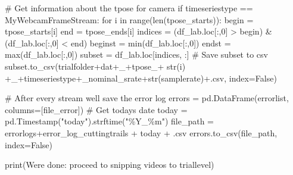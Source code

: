\documentclass[
  letterpaper,
  DIV=11,
  numbers=noendperiod]{scrreprt}
\newenvironment{Shaded}{\begin{snugshade}}{\end{snugshade}}
\newcommand{\BuiltInTok}[1]{\textcolor[rgb]{0.00,0.23,0.31}{#1}}
\newcommand{\CommentTok}[1]{\textcolor[rgb]{0.37,0.37,0.37}{#1}}
\newcommand{\ControlFlowTok}[1]{\textcolor[rgb]{0.00,0.23,0.31}{#1}}
\newcommand{\DecValTok}[1]{\textcolor[rgb]{0.68,0.00,0.00}{#1}}
\newcommand{\KeywordTok}[1]{\textcolor[rgb]{0.00,0.23,0.31}{#1}}
\newcommand{\NormalTok}[1]{\textcolor[rgb]{0.00,0.23,0.31}{#1}}
\newcommand{\OperatorTok}[1]{\textcolor[rgb]{0.37,0.37,0.37}{#1}}
\newcommand{\StringTok}[1]{\textcolor[rgb]{0.13,0.47,0.30}{#1}}
\newcommand{\VariableTok}[1]{\textcolor[rgb]{0.07,0.07,0.07}{#1}}
\begin{document}
\begin{Shaded}
\begin{Highlighting}[]
            \CommentTok{\# Get information about the tpose for camera}
            \ControlFlowTok{if}\NormalTok{ timeseriestype }\OperatorTok{==} \StringTok{\textquotesingle{}MyWebcamFrameStream\textquotesingle{}}\NormalTok{:}
                \ControlFlowTok{for}\NormalTok{ i }\KeywordTok{in} \BuiltInTok{range}\NormalTok{(}\BuiltInTok{len}\NormalTok{(tpose\_starts)):}
\NormalTok{                    begin }\OperatorTok{=}\NormalTok{ tpose\_starts[i]}
\NormalTok{                    end }\OperatorTok{=}\NormalTok{ tpose\_ends[i]}
\NormalTok{                    indices }\OperatorTok{=}\NormalTok{ (df\_lab.loc[:,}\DecValTok{0}\NormalTok{] }\OperatorTok{\textgreater{}}\NormalTok{ begin) }\OperatorTok{\&}\NormalTok{ (df\_lab.loc[:,}\DecValTok{0}\NormalTok{] }\OperatorTok{\textless{}}\NormalTok{ end)}
\NormalTok{                    beginst }\OperatorTok{=} \BuiltInTok{min}\NormalTok{(df\_lab.loc[:,}\DecValTok{0}\NormalTok{])}
\NormalTok{                    endst }\OperatorTok{=} \BuiltInTok{max}\NormalTok{(df\_lab.loc[:,}\DecValTok{0}\NormalTok{])}
\NormalTok{                    subset }\OperatorTok{=}\NormalTok{ df\_lab.loc[indices, :]}
                    \CommentTok{\# Save subset to csv}
\NormalTok{                    subset.to\_csv(trialfolder}\OperatorTok{+}\NormalTok{dat}\OperatorTok{+}\StringTok{\textquotesingle{}\_\textquotesingle{}}\OperatorTok{+}\StringTok{\textquotesingle{}tpose\_\textquotesingle{}}\OperatorTok{+} \BuiltInTok{str}\NormalTok{(i) }\OperatorTok{+}\StringTok{\textquotesingle{}\_\textquotesingle{}}\OperatorTok{+}\NormalTok{timeseriestype}\OperatorTok{+}\StringTok{\textquotesingle{}\_nominal\_srate\textquotesingle{}}\OperatorTok{+}\BuiltInTok{str}\NormalTok{(samplerate)}\OperatorTok{+}\StringTok{\textquotesingle{}.csv\textquotesingle{}}\NormalTok{, index}\OperatorTok{=}\VariableTok{False}\NormalTok{)}
        
        \CommentTok{\# After every stream we\textquotesingle{}ll save the error log}
\NormalTok{        errors }\OperatorTok{=}\NormalTok{ pd.DataFrame(errorlist, columns}\OperatorTok{=}\NormalTok{[}\StringTok{\textquotesingle{}file\_error\textquotesingle{}}\NormalTok{])}
        \CommentTok{\# Get todays date}
\NormalTok{        today }\OperatorTok{=}\NormalTok{ pd.Timestamp(}\StringTok{"today"}\NormalTok{).strftime(}\StringTok{"\%Y\_\%m"}\NormalTok{)}
\NormalTok{        file\_path }\OperatorTok{=}\NormalTok{ errorlogs}\OperatorTok{+}\StringTok{\textquotesingle{}error\_log\_cuttingtrails\textquotesingle{}} \OperatorTok{+}\NormalTok{ today }\OperatorTok{+} \StringTok{\textquotesingle{}.csv\textquotesingle{}}
\NormalTok{        errors.to\_csv(file\_path, index}\OperatorTok{=}\VariableTok{False}\NormalTok{) }
        
\BuiltInTok{print}\NormalTok{(}\StringTok{\textquotesingle{}Were done: proceed to snipping videos to triallevel\textquotesingle{}}\NormalTok{)}
\end{Highlighting}
\end{Shaded}
\end{document}
